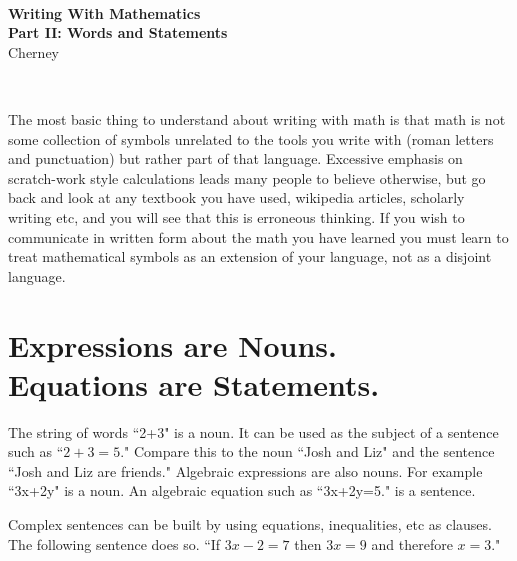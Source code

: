 \documentclass[12pt]{article}
\begin{document}
\thispagestyle{empty}
~
\vspace{-3.9cm}
\begin{center}
{
\Large
 {\bfseries  Writing With Mathematics \\
 Part II: Words and Statements }  \\[10mm]
 {  
 \vspace{-.9cm} 
Cherney}\\[1mm]
\vspace{3.5mm}
}

\end{center}
\


The most basic thing to understand about writing with math is that math is not some collection of symbols unrelated to the tools you write with (roman letters and punctuation) but rather part of that language. Excessive emphasis on scratch-work style calculations leads many people to believe otherwise, but go back and look at any textbook you have used, wikipedia articles, scholarly writing etc, and you will see that this is erroneous thinking. If you wish to communicate in written form about the math you have learned you must learn to treat mathematical symbols as an extension of your language, not as a disjoint language. 

\section{Expressions are Nouns.\\ Equations are Statements.}
The string of words ``2+3" is a noun. 
It can be used as the subject of a sentence such as ``$2+3=5.$" 
Compare this to the noun ``Josh and Liz" and the sentence ``Josh and Liz are friends." 
Algebraic expressions are also nouns. For example ``3x+2y" is a noun.  An algebraic equation such as ``3x+2y=5." is a sentence. 

Complex sentences can be built by using  equations, inequalities, etc as clauses. 
The following sentence does so. 
``If $3x-2=7$ then $3x=9$ and therefore $x=3$."
\\
\end{document}
